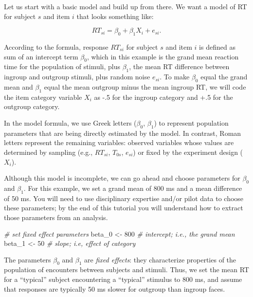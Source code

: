 \documentclass[
  english,
  doc,floatsintext]{apa6}
\newenvironment{Shaded}{\begin{snugshade}}{\end{snugshade}}
\newcommand{\CommentTok}[1]{\textcolor[rgb]{0.56,0.35,0.01}{\textit{#1}}}
\newcommand{\DecValTok}[1]{\textcolor[rgb]{0.00,0.00,0.81}{#1}}
\newcommand{\NormalTok}[1]{#1}
\newcommand{\StringTok}[1]{\textcolor[rgb]{0.31,0.60,0.02}{#1}}
\begin{document}
Let us start with a basic model and build up from there. We want a model of RT for subject \(s\) and item \(i\) that looks something like:

\begin{equation}
RT_{si} = \beta_0 + \beta_1 X_{i} + e_{si}.
\end{equation}

\noindent According to the formula, response \(RT_{si}\) for subject \(s\) and item \(i\) is defined as sum of an intercept term \(\beta_0\), which in this example is the grand mean reaction time for the population of stimuli, plus \(\beta_1\), the mean RT difference between ingroup and outgroup stimuli, plus random noise \(e_{si}\). To make \(\beta_0\) equal the grand mean and \(\beta_1\) equal the mean outgroup minus the mean ingroup RT, we will code the item category variable \(X_{i}\) as -.5 for the ingroup category and +.5 for the outgroup category.

In the model formula, we use Greek letters (\(\beta_0\), \(\beta_1\)) to represent population parameters that are being directly estimated by the model. In contrast, Roman letters represent the remaining variables: observed variables whose values are determined by sampling (e.g., \(RT_{si}\), \(T_{0s}\), \(e_{si}\)) or fixed by the experiment design (\(X_i\)).

Although this model is incomplete, we can go ahead and choose parameters for \(\beta_0\) and \(\beta_1\). For this example, we set a grand mean of 800 ms and a mean difference of 50 ms. You will need to use disciplinary expertise and/or pilot data to choose these parameters; by the end of this tutorial you will understand how to extract those parameters from an analysis.

\begin{Shaded}
\begin{Highlighting}[]
\CommentTok{# set fixed effect parameters}
\NormalTok{beta_}\DecValTok{0}\NormalTok{ <-}\StringTok{ }\DecValTok{800} \CommentTok{# intercept; i.e., the grand mean}
\NormalTok{beta_}\DecValTok{1}\NormalTok{ <-}\StringTok{  }\DecValTok{50} \CommentTok{# slope; i.e, effect of category}
\end{Highlighting}
\end{Shaded}

\noindent The parameters \(\beta_0\) and \(\beta_1\) are \emph{fixed effects}: they characterize properties of the population of encounters between subjects and stimuli. Thus, we set the mean RT for a \enquote{typical} subject encountering a \enquote{typical} stimulus to 800 ms, and assume that responses are typically 50 ms slower for outgroup than ingroup faces.
\end{document}
